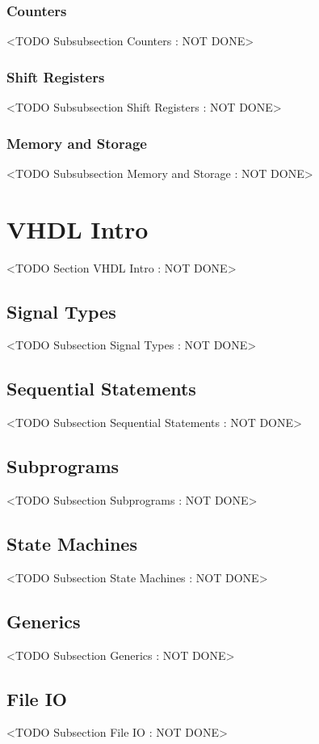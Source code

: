 \subsubsection{Counters}
	<TODO Subsubsection  Counters : NOT DONE>

\subsubsection{Shift Registers}
	<TODO Subsubsection  Shift Registers : NOT DONE>

\subsubsection{Memory and Storage}
	<TODO Subsubsection  Memory and Storage : NOT DONE>

\section{VHDL Intro}
	<TODO Section VHDL Intro : NOT DONE>

\subsection{Signal Types}
	<TODO Subsection Signal Types : NOT DONE>

\subsection{Sequential Statements}
	<TODO Subsection Sequential Statements : NOT DONE>

\subsection{Subprograms}
	<TODO Subsection Subprograms : NOT DONE>

\subsection{State Machines}
	<TODO Subsection State Machines : NOT DONE>

\subsection{Generics}
	<TODO Subsection Generics : NOT DONE>

\subsection{File IO}
	<TODO Subsection File IO : NOT DONE>

